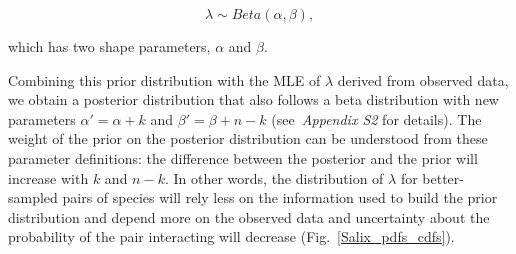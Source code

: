 \documentclass[12pt]{article}
\begin{document}
\begin{spacing}{2.0}
    \begin{equation}
          \lambda \sim Beta(\alpha,\beta) , \label{prior}
        \end{equation}

        \noindent which has two shape parameters, $\alpha$ and $\beta$. 

    Combining this prior distribution with the MLE of $\lambda$ derived from observed data, we obtain a posterior distribution that also follows a beta distribution with new parameters $\alpha'= \alpha+k$ and $\beta'=\beta+n-k$ (see~\emph{Appendix S2} for details). The weight of the prior on the posterior distribution can be understood from these parameter definitions: the difference between the posterior and the prior will increase with $k$ and $n-k$. In other words, the distribution of $\lambda$ for better-sampled pairs of species will rely less on the information used to build the prior distribution and depend more on the observed data and uncertainty about the probability of the pair interacting will decrease (Fig.~\ref{Salix_pdfs_cdfs}). 









\end{spacing}
\end{document}
